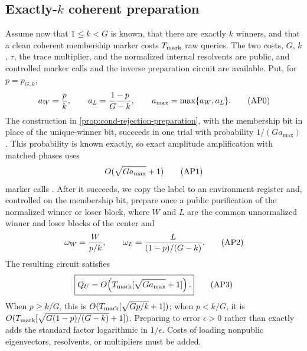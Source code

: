 \subsection{Exactly-\texorpdfstring{$k$}{k} coherent preparation}
\label{sec:condensation-exact-k-preparation}

Assume now that $1\le k<G$ is known, that there are exactly $k$ winners, and
that a clean coherent membership marker costs $T_{\rm mark}$ raw queries.
The two costs, $G$, $k$, $\tau$, the trace multiplier, and the normalized
internal resolvents are public, and controlled marker calls and the inverse
preparation circuit are available.  Put, for $p=p_{G,k}$,
\begin{equation*}
 a_W=\frac pk,\qquad a_L=\frac{1-p}{G-k},\qquad
 a_{\max}=\max\{a_W,a_L\}.                               \condtag{AP0}\label{eq:cond-ap0}
\end{equation*}
The construction in \cref{prop:cond-rejection-preparation}, with the
membership bit in place of the unique-winner bit, succeeds in one trial with
probability $1/(Ga_{\max})$.  This probability is known exactly, so exact
amplitude amplification with matched phases uses
\begin{equation*}
 O(\sqrt{Ga_{\max}}+1)                                    \condtag{AP1}\label{eq:cond-ap1}
\end{equation*}
marker calls
\cite{brassard2002-quantum-amplitude-amplification-and-estimation}.  After
it succeeds, we copy the label to an environment register and, controlled
on the membership bit, prepare once a public purification of the normalized
winner or loser block, where $W$ and $L$ are the common unnormalized winner
and loser blocks of the center and
\begin{equation*}
 \omega_W=\frac{W}{p/k},\qquad
 \omega_L=\frac{L}{(1-p)/(G-k)}.                                     \condtag{AP2}\label{eq:cond-ap2}
\end{equation*}
The resulting circuit satisfies
\begin{equation*}
 \boxed{Q_U=O\!\left(T_{\rm mark}[\sqrt{Ga_{\max}}+1]\right).}         \condtag{AP3}\label{eq:cond-ap3}
\end{equation*}
When $p\ge k/G$, this is $O(T_{\rm mark}[\sqrt{Gp/k}+1])$; when
$p<k/G$, it is $O(T_{\rm mark}[\sqrt{G(1-p)/(G-k)}+1])$.  Preparing to
error $\epsilon>0$ rather than exactly adds the standard factor logarithmic
in $1/\epsilon$.  Costs of loading nonpublic eigenvectors, resolvents, or
multipliers must be added.

